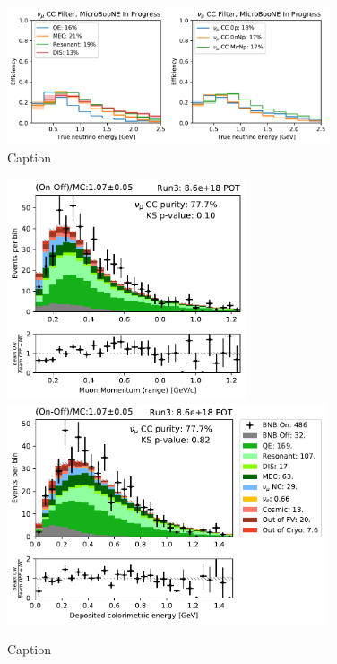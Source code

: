\begin{figure}
    \centering
    \includegraphics[width=0.85\textwidth]{NuMuCCsel/Images/run3/numu_efficiency_run3.pdf}
    \caption{Caption}
    \label{fig:numu_eff_r3}
\end{figure}


\begin{figure}
    \centering
    \includegraphics[height=6.5cm]{NuMuCCsel/Images/run3/numu_rangemom_run3.pdf} \hspace{2mm}
    \includegraphics[height=6.5cm]{NuMuCCsel/Images/run3/numu_caloe_run3.pdf}
    \caption{Caption}
    \label{fig:numu_energy}
\end{figure}

